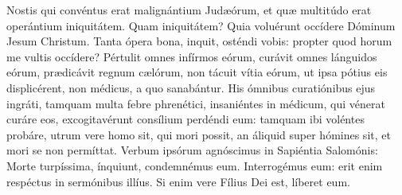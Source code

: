 
\lettrine{N}{o}stis qui convéntus erat malignántium Judæórum, et quæ multitúdo erat operántium iniquitátem. Quam iniquitátem? Quia voluérunt occídere Dóminum Jesum Christum. Tanta ópera bona, inquit, osténdi vobis: propter quod horum me vultis occídere? Pértulit omnes infírmos eórum, curávit omnes lánguidos eórum, prædicávit regnum cælórum, non tácuit vítia eórum, ut ipsa pótius eis displicérent, non médicus, a quo sanabántur. His ómnibus curatiónibus ejus ingráti, tamquam multa febre phrenétici, insaniéntes in médicum, qui vénerat curáre eos, excogitavérunt consílium perdéndi eum: tamquam ibi voléntes probáre, utrum vere homo sit, qui mori possit, an áliquid super hómines sit, et mori se non permíttat. Verbum ipsórum agnóscimus in Sapiéntia Salomónis: Morte turpíssima, ínquiunt, condemnémus eum. Interrogémus eum: erit enim respéctus in sermónibus illíus. Si enim vere Fílius Dei est, líberet eum.